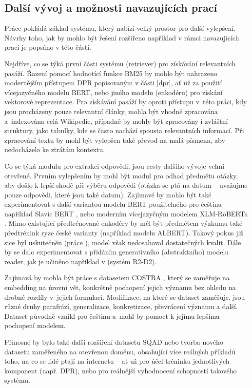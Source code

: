 \subsection{Další vývoj a možnosti navazujících prací}
Práce pokládá základ systému, který nabízí velký prostor pro další vylepšení. Návrhy toho, jak by mohlo být řešení rozšířeno například v rámci navazujících prací je popsáno v této části.\par
Nejdříve, co se týká první části systému (retriever) pro získávání relevantních pasáží. Řazení pomocí hodnotící funkce BM25 by mohlo být nahrazeno modernějším přístupem DPR popisovaným v části \ref{dpr}, ať už za použití vícejazyčného modelu BERT, nebo jiného modelu (enkodéru) pro získání vektorové reprezentace. Pro získávání pasáží by oproti přístupu v~této práci, kdy jsou procházeny pouze relevantní články, mohla být vhodně zpracována a~indexována celá Wikipedie, případně by mohly být zpracovány i zvláštní struktury, jako tabulky, kde se často nachází spousta relevantních informací. Při zpracování textu by mohl být vylepšen také převod na malá písmena, aby nedocházelo ke ztrátám kontextu.\par
Co se týká modulu pro extrakci odpovědi, jsou cesty dalšího vývoje velmi otevřené. Prvním vylepšením by mohl být modul pro odhad předmětu otázky, aby došlo k lepší shodě při výběru odpovědi (otázka se ptá na datum -- uvažujme pouze odpovědi, které jsou také datum). Zajímavé by mohlo být také experimentovat s další variantou modelu BERT použitelného pro češtinu -- například Slavic BERT \cite{slavicBERT}, nebo moderním vícejazyčným modelem XLM-RoBERTa \cite{xlm-roberta}. Mimo existující předtrénované enkodéry by měl být předmětem výzkumu také předtrénink ryze české varianty (například modelu ALBERT). Takový pokus již sice byl uskutečněn (práce \cite{Zelina2020thesis}), model však nedosahoval dostatečných kvalit. Dále by se dalo experimentovat s přidáním generativního (abstraktního) modelu reader, jak je učiněno například v \cite{fajcik2021pruning} (systém R2-D2).\par
Zajímavá by mohla být práce s datasetem COSTRA \cite{costra}, který se zaměřuje na embedding na úrovni vět, konkrétně pochopení jejich významu bez ohledu na drobné rozdíly v~jejich formulaci. Modifikace, na které se dataset zaměřuje, jsou různé druhy parafrází, generalizace, konkretizace, převrácení významu a další. Dataset původně vznikl pro češtinu a~mohl by pomoct k jejímu lepšímu pochopení modelem.\par
Přínosné by bylo také další rozšíření datasetu SQAD nebo tvorba nového datasetu zaměřeného na otevřenou doménu, obsahující více reálných příkladů toho, na co se lidé ptají na internetu -- ať už pro účel tréninku jednotlivých komponent (např. DPR), nebo pro reálnější vyhodnocení schopností takového systému.

